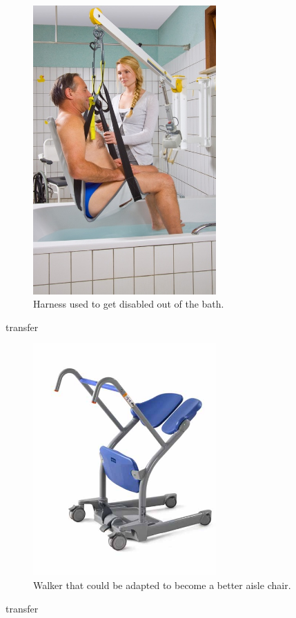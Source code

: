 \begin{figure}[h]
  \centering
     \includegraphics[width=7cm]{images/harness.jpg}
   \caption{Harness used to get disabled out of the bath.}%
  \label{fig:harness.jpg}
\end{figure} 
transfer

\begin{figure}[h]
  \centering
     \includegraphics[width=7cm]{images/walker.jpg}
   \caption{Walker that could be adapted to become a better aisle chair.}%
  \label{fig:walker.jpg}
\end{figure} 
transfer

